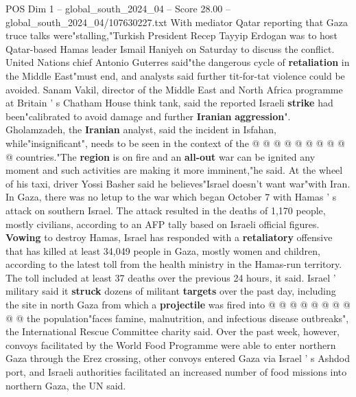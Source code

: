 \begin{textsample}{POS Dim 1 – global\_south\_2024\_04 – Score 28.00 – global\_south\_2024\_04/107630227.txt}
With mediator Qatar reporting that Gaza truce talks were"stalling,"Turkish President Recep Tayyip Erdogan was to host Qatar-based Hamas leader Ismail Haniyeh on Saturday to discuss the conflict.
United Nations chief Antonio Guterres said"the dangerous cycle of \textbf{retaliation} in the Middle East"must end, and analysts said further tit-for-tat violence could be avoided.
Sanam Vakil, director of the Middle East and North Africa programme at Britain ' s Chatham House think tank, said the reported Israeli \textbf{strike} had been"calibrated to avoid damage and further \textbf{Iranian} \textbf{aggression}".
Gholamzadeh, the \textbf{Iranian} analyst, said the incident in Isfahan, while"insignificant", needs to be seen in the context of the @ @ @ @ @ @ @ @ @ @ countries."The \textbf{region} is on fire and an \textbf{all-out} war can be ignited any moment and such activities are making it more imminent,"he said.
At the wheel of his taxi, driver Yossi Basher said he believes"Israel doesn't want war"with Iran.
In Gaza, there was no letup to the war which began October 7 with Hamas ' s attack on southern Israel.
The attack resulted in the deaths of 1,170 people, mostly civilians, according to an AFP tally based on Israeli official figures. \textbf{Vowing} to destroy Hamas, Israel has responded with a \textbf{retaliatory} offensive that has killed at least 34,049 people in Gaza, mostly women and children, according to the latest toll from the health ministry in the Hamas-run territory.
The toll included at least 37 deaths over the previous 24 hours, it said.
Israel ' military said it \textbf{struck} dozens of militant \textbf{targets} over the past day, including the site in north Gaza from which a \textbf{projectile} was fired into @ @ @ @ @ @ @ @ @ @ the population"faces famine, malnutrition, and infectious disease outbreaks", the International Rescue Committee charity said.
Over the past week, however, convoys facilitated by the World Food Programme were able to enter northern Gaza through the Erez crossing, other convoys entered Gaza via Israel ' s Ashdod port, and Israeli authorities facilitated an increased number of food missions into northern Gaza, the UN said.

\end{textsample}
